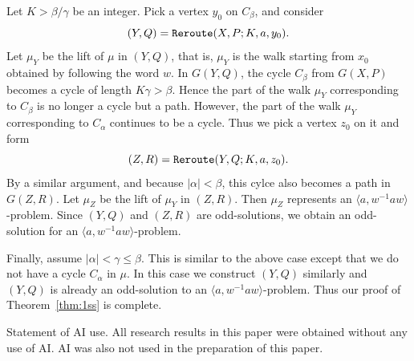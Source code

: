 \documentclass[11pt]{amsart}
\theoremstyle{definition}
\theoremstyle{definition}
\numberwithin{equation}{section}
\begin{document}
Let $K>\beta/\gamma$ be an integer. Pick a vertex $y_0$ on $C_\beta$, and consider
$$ (Y, Q)=\mbox{\tt Reroute}(X, P; K, a, y_0). $$
Let $\mu_Y$ be the lift of $\mu$ in $(Y, Q)$, that is, $\mu_Y$ is the walk starting from $x_0$ obtained by following the word $w$. In $G(Y, Q)$, the cycle $C_\beta$ from $G(X, P)$ becomes a cycle of length $K\gamma>\beta$. Hence the part of the walk $\mu_Y$ corresponding to $C_\beta$ is no longer a cycle but a path. However, the part of the walk $\mu_Y$ corresponding to $C_\alpha$ continues to be a cycle. Thus we pick a vertex $z_0$ on it and form
$$ (Z, R)=\mbox{\tt Reroute}(Y, Q; K, a, z_0). $$
By a similar argument, and because $|\alpha|<\beta$, this cylce also becomes a path in $G(Z, R)$. Let $\mu_Z$ be the lift of $\mu_Y$ in $(Z, R)$. Then $\mu_Z$ represents an $\langle a, w^{-1}aw\rangle$-problem. Since $(Y, Q)$ and $(Z, R)$ are odd-solutions, we obtain an odd-solution for an $\langle a, w^{-1}aw\rangle$-problem. 

Finally, assume $|\alpha|<\gamma\leq \beta$. This is similar to the above case except that we do not have a cycle $C_\alpha$ in $\mu$. In this case we construct $(Y, Q)$ similarly and $(Y, Q)$ is already an odd-solution to an $\langle a, w^{-1}aw\rangle$-problem. Thus our proof of Theorem~\ref{thm:1ss} is complete.




\bigskip

{\sc Statement of AI use.} All research results in this paper were obtained without any use of AI. AI was also not used in the preparation of this paper. 
\end{document}
